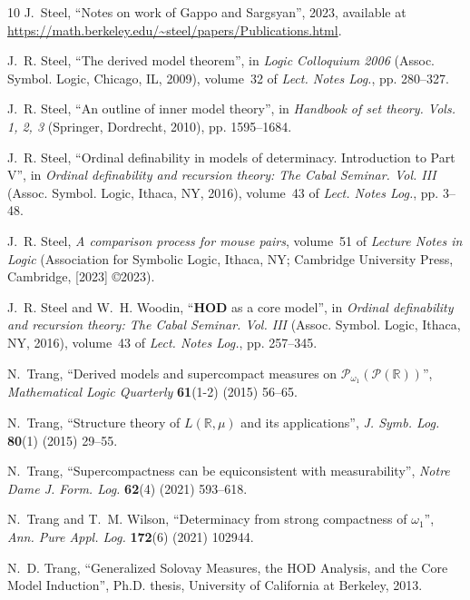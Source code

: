 \documentclass{amsart}
\begin{document}
\begin{thebibliography}{10}
J.~Steel, \enquote{Notes on work of {G}appo and {S}argsyan}, 2023, available at
  \url{https://math.berkeley.edu/~steel/papers/Publications.html}.

J.~R. Steel, \enquote{The derived model theorem}, in \emph{Logic {C}olloquium
  2006} (Assoc. Symbol. Logic, Chicago, IL, 2009), volume~32 of \emph{Lect.
  Notes Log.}, pp. 280--327.

J.~R. Steel, \enquote{An outline of inner model theory}, in \emph{Handbook of
  set theory. {V}ols. 1, 2, 3} (Springer, Dordrecht, 2010), pp. 1595--1684.

J.~R. Steel, \enquote{Ordinal definability in models of determinacy.
  {I}ntroduction to {P}art {V}}, in \emph{Ordinal definability and recursion
  theory: {T}he {C}abal {S}eminar. {V}ol. {III}} (Assoc. Symbol. Logic, Ithaca,
  NY, 2016), volume~43 of \emph{Lect. Notes Log.}, pp. 3--48.

J.~R. Steel, \emph{A comparison process for mouse pairs}, volume~51 of
  \emph{Lecture Notes in Logic} (Association for Symbolic Logic, Ithaca, NY;
  Cambridge University Press, Cambridge, [2023] \copyright 2023).

J.~R. Steel and W.~H. Woodin, \enquote{{\bf {HOD}} as a core model}, in
  \emph{Ordinal definability and recursion theory: {T}he {C}abal {S}eminar.
  {V}ol. {III}} (Assoc. Symbol. Logic, Ithaca, NY, 2016), volume~43 of
  \emph{Lect. Notes Log.}, pp. 257--345.

N.~Trang, \enquote{{Derived models and supercompact measures on
  $\mathcal{P}_{\omega_1}(\mathcal{P}(\mathbb{R}))$}}, \emph{Mathematical Logic
  Quarterly} \textbf{61}(1-2) (2015) 56--65.

N.~Trang, \enquote{{Structure theory of $L(\mathbb{R},\mu)$ and its
  applications}}, \emph{{J. Symb. Log.}} \textbf{80}(1) (2015) 29--55.

N.~Trang, \enquote{Supercompactness can be equiconsistent with measurability},
  \emph{Notre Dame J. Form. Log.} \textbf{62}(4) (2021) 593--618.

N.~Trang and T.~M. Wilson, \enquote{{Determinacy from strong compactness of
  $\omega_1$}}, \emph{Ann. Pure Appl. Log.} \textbf{172}(6) (2021) 102944.

N.~D. Trang, \enquote{{Generalized Solovay Measures, the HOD Analysis, and the
  Core Model Induction}}, Ph.D. thesis, University of California at Berkeley,
  2013.


\end{thebibliography}
\end{document}
